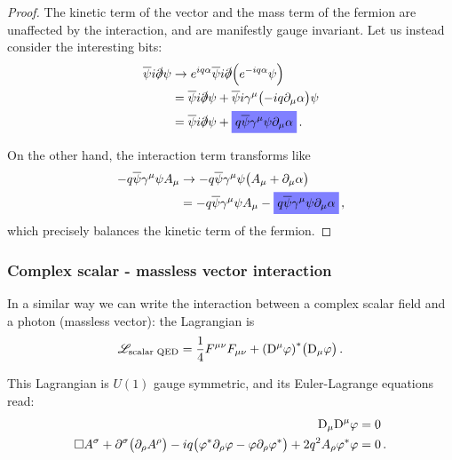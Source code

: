\documentclass[main.tex]{subfiles}
\begin{document}
\begin{proof}
The kinetic term of the vector and the mass term of the fermion are unaffected by the interaction, and are manifestly gauge invariant. 
Let us instead consider the interesting bits: 
%
\begin{subequations}
\begin{align}
\overline{\psi} i \slashed{\partial} \psi &\to e^{iq \alpha } \overline{\psi} i \slashed{\partial} \qty(e^{-iq \alpha } \psi )  \\
&= \overline{\psi} i \slashed{\partial} \psi 
+ \overline{\psi} i \gamma^{\mu } \qty(-iq \partial_{\mu } \alpha ) \psi  \\
&= \overline{\psi} i \slashed{\partial} \psi
+ \hlc{blue}{q \overline{\psi} \gamma^{\mu } \psi   \partial_{\mu } \alpha }
\,.
\end{align}
\end{subequations}

On the other hand, the interaction term transforms like 
%
\begin{subequations}
\begin{align}
- q \overline{\psi} \gamma^{\mu } \psi A_{\mu } &\to -q \overline{\psi} \gamma^{\mu } \psi \qty(A_{\mu } + \partial_{\mu } \alpha )  \\
&= -q \overline{\psi} \gamma^{\mu } \psi A_{\mu } - 
\hlc{blue}{q \overline{\psi} \gamma^{\mu } \psi \partial_{\mu } \alpha }
\,,
\end{align}
\end{subequations}
%
which precisely balances the kinetic term of the fermion. 
\end{proof}

\subsubsection{Complex scalar - massless vector interaction}

In a similar way we can write the interaction between a complex scalar field and a photon (massless vector): the Lagrangian is 
%
\begin{align}
\mathscr{L} _{\text{scalar QED}}
= \frac{1}{4} F^{\mu \nu } F_{\mu \nu } 
+ \qty(\mathrm{D}^{\mu } \varphi )^{*} \qty(\mathrm{D}_{\mu } \varphi )
\,.
\end{align}

\begin{claim}
This Lagrangian is \(U(1)\) gauge symmetric, and 
its Euler-Lagrange equations read: 
%
\begin{subequations}
\begin{align}
\mathrm{D}_{\mu } \mathrm{D}^{\mu } \varphi &= 0   \\
\square A^{\sigma } + \partial^{\sigma } \qty(\partial_{\rho } A^{\rho })
-iq \qty(\varphi^{*} \partial_{\rho } \varphi - \varphi \partial_{\rho } \varphi^{*})
+ 2 q^2 A_{\rho } \varphi^{*} \varphi 
&=0
\,.
\end{align}
\end{subequations}
\end{claim}
\end{document}
